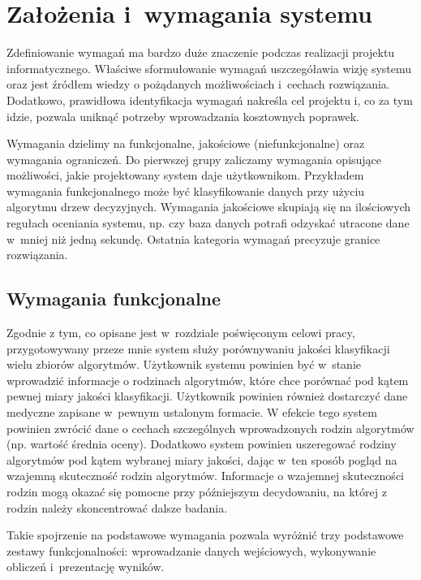 \documentclass[../thesis.tex]{subfiles}
\begin{document}
\pagestyle{plain}

\chapter{Założenia i~wymagania systemu}

Zdefiniowanie wymagań ma bardzo duże znaczenie podczas realizacji projektu informatycznego. Właściwe sformułowanie wymagań uszczegóławia wizję systemu oraz jest źródłem wiedzy o pożądanych możliwościach i~cechach rozwiązania. Dodatkowo, prawidłowa identyfikacja wymagań nakreśla cel projektu i, co za tym idzie, pozwala uniknąć potrzeby wprowadzania kosztownych poprawek.

Wymagania dzielimy na funkcjonalne, jakościowe (niefunkcjonalne) oraz wymagania ograniczeń. Do pierwszej grupy zaliczamy wymagania opisujące możliwości, jakie projektowany system daje użytkownikom. Przykładem wymagania funkcjonalnego może być klasyfikowanie danych przy użyciu algorytmu drzew decyzyjnych. Wymagania jakościowe skupiają się na ilościowych regułach oceniania systemu, np. czy baza danych potrafi odzyskać utracone dane w~mniej niż jedną sekundę. Ostatnia kategoria wymagań precyzuje granice rozwiązania. 

\section{Wymagania funkcjonalne}

Zgodnie z tym, co opisane jest w~rozdziale poświęconym celowi pracy, przygotowywany przeze mnie system służy porównywaniu jakości klasyfikacji wielu zbiorów algorytmów. Użytkownik systemu powinien być w~stanie wprowadzić informacje o rodzinach algorytmów, które chce porównać pod kątem pewnej miary jakości klasyfikacji. Użytkownik powinien również dostarczyć dane medyczne zapisane w~pewnym ustalonym formacie. W efekcie tego system powinien zwrócić dane o cechach szczególnych wprowadzonych rodzin algorytmów (np. wartość średnia oceny). Dodatkowo system powinien uszeregować rodziny algorytmów pod kątem wybranej miary jakości, dając w~ten sposób pogląd na wzajemną skuteczność rodzin algorytmów. Informacje o wzajemnej skuteczności rodzin mogą okazać się pomocne przy późniejszym decydowaniu, na której z rodzin należy skoncentrować dalsze badania.

Takie spojrzenie na podstawowe wymagania pozwala wyróżnić trzy podstawowe zestawy funkcjonalności: wprowadzanie danych wejściowych, wykonywanie obliczeń i~prezentację wyników.
\end{document}
